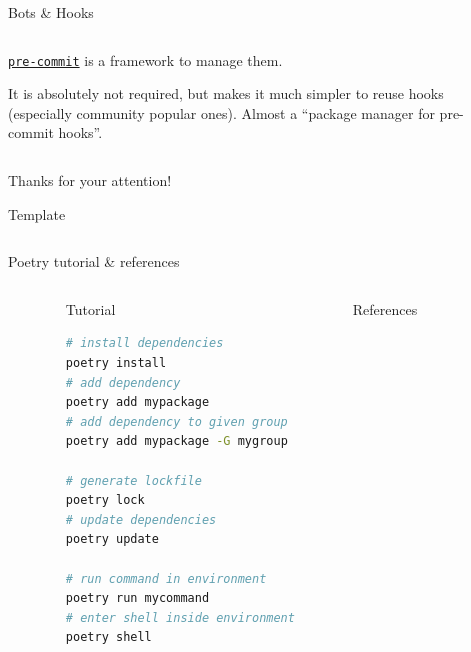 \documentclass[9pt]{beamer}
\begin{document}
\begin{frame}{Bots \& Hooks}
\begin{columns}
\begin{column}{0.45\textwidth}
            \href{https://pre-commit.com/}{\texttt{pre-commit}} is a framework
            to manage them.
            \vspace*{10pt}

            It is absolutely not required, but makes it much simpler to reuse
            hooks (especially community popular ones).
            Almost a \enquote{package manager for pre-commit hooks}.
            \vspace*{15pt}
        \end{column}
        \begin{column}{0.05\textwidth}
        \end{column}
    \end{columns}
\end{frame}

\begin{frame}[standout]
    Thanks for your attention!
\end{frame}

\appendix

\begin{frame}{Template}
    \begin{columns}
        \begin{column}{0.5\textwidth}
            
        \end{column}
        \begin{column}{0.5\textwidth}
            
        \end{column}
    \end{columns}
\end{frame}

\begin{frame}[fragile]{Poetry tutorial \& references}
    \begin{columns}
        \begin{column}{0.1\textwidth}
        \end{column}
        \begin{column}{0.4\textwidth}
            Tutorial
            \begin{lstlisting}[language=bash,style=mystyle]
# install dependencies
poetry install
# add dependency
poetry add mypackage
# add dependency to given group
poetry add mypackage -G mygroup

# generate lockfile
poetry lock
# update dependencies
poetry update

# run command in environment
poetry run mycommand
# enter shell inside environment
poetry shell\end{lstlisting}
        \end{column}
        \begin{column}{0.4\textwidth}
            References
            \lipsum[1]
        \end{column}
        \begin{column}{0.1\textwidth}
        \end{column}
    \end{columns}
\end{frame}
\end{document}

